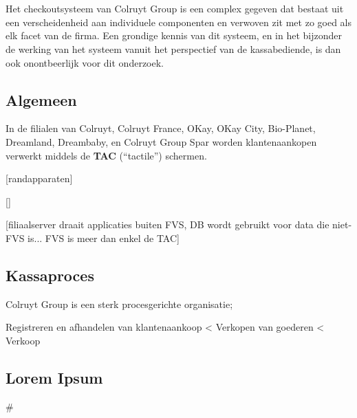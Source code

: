 
\chapter{}
\label{ch:functionele-omschrijving}

Het checkoutsysteem van Colruyt Group is een complex gegeven dat bestaat uit een verscheidenheid aan individuele componenten en verwoven zit met zo goed als elk facet van de firma. Een grondige kennis van dit systeem, en in het bijzonder de werking van het systeem vanuit het perspectief van de kassabediende, is dan ook onontbeerlijk voor dit onderzoek.

\section{Algemeen}

In de filialen van Colruyt, Colruyt France, OKay, OKay City, Bio-Planet, Dreamland, Dreambaby, en Colruyt Group Spar worden klantenaankopen verwerkt middels de \textbf{TAC} (``tactile'') schermen.

[randapparaten]

[]

[filiaalserver draait applicaties buiten FVS, DB wordt gebruikt voor data die niet-FVS is... FVS is meer dan enkel de TAC]

\section{Kassaproces}

Colruyt Group is een sterk procesgerichte organisatie; 

Registreren en afhandelen van klantenaankoop < Verkopen van goederen < Verkoop

\section{Lorem Ipsum}

#